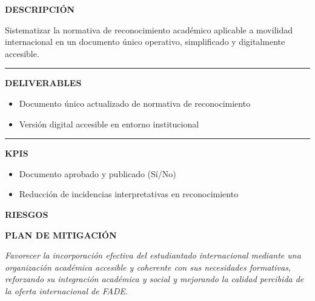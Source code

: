 \documentclass[11pt,a4paper]{scrreprt}
\newcommand{\fieldlabel}[1]{%
  {\footnotesize\sffamily\bfseries\color{mutedcolor}\MakeUppercase{#1}}\par\nopagebreak[4]
}
\newcommand{\fieldsep}{\vspace{3pt}\noindent\textcolor{bordercolor}{\rule{\linewidth}{0.4pt}}\vspace{3pt}\par}
\begin{document}
\begin{tcolorbox}[pabox={fgcolor}{PA2.2 \enspace\textbullet\enspace Actualización normativa de reconocimiento y recopilación}]

\fieldlabel{Descripci\'on}
{\small Sistematizar la normativa de reconocimiento académico aplicable a movilidad internacional en un documento único operativo, simplificado y digitalmente accesible.}\par
\fieldsep
\fieldlabel{Deliverables}
{\small \begin{itemize}[noitemsep,topsep=2pt]
\item Documento único actualizado de normativa de reconocimiento
\item Versión digital accesible en entorno institucional
\end{itemize}}\par
\fieldsep
\fieldlabel{KPIs}
{\small \begin{itemize}[noitemsep,topsep=2pt]
\item Documento aprobado y publicado (Sí/No)
\item Reducción de incidencias interpretativas en reconocimiento
\end{itemize}}\par
\end{tcolorbox}
\begin{tcolorbox}[riskbox]
{\footnotesize\sffamily\bfseries\color{red!50!black} RIESGOS}\par{}
\end{tcolorbox}
\begin{tcolorbox}[mitbox]
{\footnotesize\sffamily\bfseries\color{green!40!black} PLAN DE MITIGACI\'ON}\par{}
\end{tcolorbox}
\vspace{8pt}

\newpage
{}
{\small\color{mutedcolor}\itshape Favorecer la incorporación efectiva del estudiantado internacional mediante una organización académica accesible y coherente con sus necesidades formativas, reforzando su integración académica y social y mejorando la calidad percibida de la oferta internacional de FADE. }\par\vspace{6pt}
\end{document}
